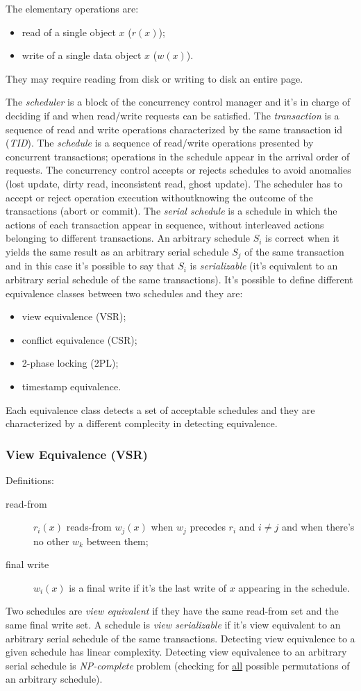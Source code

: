 The elementary operations are:
\begin{itemize}
	\item read of a single object $x$ ($r(x)$);
	\item write of a single data object $x$ ($w(x)$).
\end{itemize}
They may require reading from disk or writing to disk an entire page.

The \emph{scheduler} is a block of the concurrency control manager and it's in charge of deciding if and when read/write requests can be satisfied.
The \emph{transaction} is a sequence of read and write operations characterized by the same transaction id (\emph{TID}).
The \emph{schedule} is a sequence of read/write operations presented by concurrent transactions; operations in
the schedule appear in the arrival order of requests.
The concurrency control accepts or rejects schedules to avoid anomalies (lost update, dirty read, inconsistent read, ghost update).
The scheduler has to accept or reject operation execution withoutknowing the outcome of the transactions (abort or commit).
The \emph{serial schedule} is a schedule in which the actions of each transaction appear in sequence, without interleaved actions belonging to different transactions.
An arbitrary schedule $S_i$ is correct when it yields the same result as an arbitrary serial schedule $S_j$ of the same transaction and in this case it's possible to say that $S_i$ is \emph{serializable} (it's equivalent to an arbitrary serial schedule of the same transactions).
It's possible to define different equivalence classes between two schedules and they are:
\begin{itemize}
	\item view equivalence (VSR);
	\item conflict equivalence (CSR);
	\item 2-phase locking (2PL);
	\item timestamp equivalence.
\end{itemize}
Each equivalence class detects a set of acceptable schedules and they are characterized by a different complecity in detecting equivalence.

\subsubsection{View Equivalence (VSR)}
Definitions:
\begin{description}
	\item[read-from] $r_i(x)$ reads-from $w_j(x)$ when $w_j$ precedes $r_i$ and $i \neq j$ and when there's no other $w_k$ between them;
	\item[final write] $w_i(x)$ is a final write if it's the last write of $x$ appearing in the schedule.
\end{description}
Two schedules are \emph{view equivalent} if they have the same read-from set and the same final write set.
A schedule is \emph{view serializable} if it's view equivalent to an arbitrary serial schedule of the same transactions.
Detecting view equivalence to a given schedule has linear complexity.
Detecting view equivalence to an arbitrary serial schedule is \emph{NP-complete} problem (checking for \underline{all} possible permutations of an arbitrary schedule).

